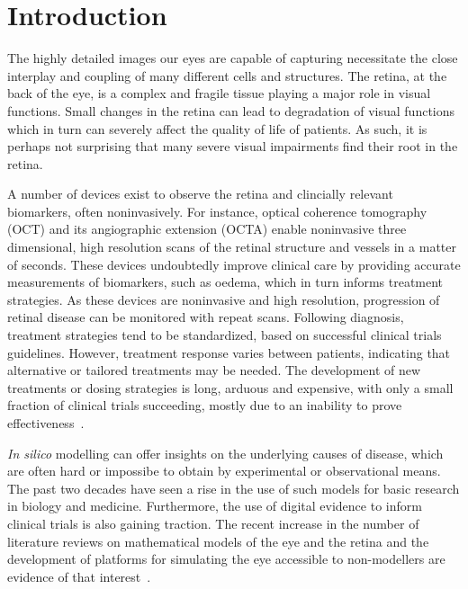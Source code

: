 \documentclass{article}
\begin{document}
\section{Introduction}\label{sec:Introduction}
  
The highly detailed images our eyes are capable of capturing necessitate the close interplay and coupling of many different cells and structures.
The retina, at the back of the eye, is a complex and fragile tissue playing a major role in visual functions.
Small changes in the retina can lead to degradation of visual functions which in turn can severely affect the quality of life of patients.
As such, it is perhaps not surprising that many severe visual impairments find their root in the retina.

A number of devices exist to observe the retina and clincially relevant biomarkers, often noninvasively.
For instance, optical coherence tomography (OCT) and its angiographic extension (OCTA) enable noninvasive three dimensional, high resolution scans of the retinal structure and vessels in a matter of seconds.
These devices undoubtedly improve clinical care by providing accurate measurements of biomarkers, such as oedema, which in turn informs treatment strategies.
As these devices are noninvasive and high resolution, progression of retinal disease can be monitored with repeat scans.
Following diagnosis, treatment strategies tend to be standardized, based on successful clinical trials guidelines.
However, treatment response varies between patients, indicating that alternative or tailored treatments may be needed.
The development of new treatments or dosing strategies is long, arduous and expensive, with only a small fraction of clinical trials succeeding, mostly due to an inability to prove effectiveness~\cite{Fogel_2018}.

\textit{In silico} modelling can offer insights on the underlying causes of disease, which are often hard or impossibe to obtain by experimental or observational means.
The past two decades have seen a rise in the use of such models for basic research in biology and medicine.
Furthermore, the use of digital evidence to inform clinical trials is also gaining traction. 
The recent increase in the number of literature reviews on mathematical models of the eye and the retina and the development of platforms for simulating the eye accessible to non-modellers are evidence of that interest~\cite{Arciero_2019,Arciero_2017,Bhandari_2021,Harris_2013,Prudhomme_2021,Roberts_2016,Sala_2018}.
\end{document}

